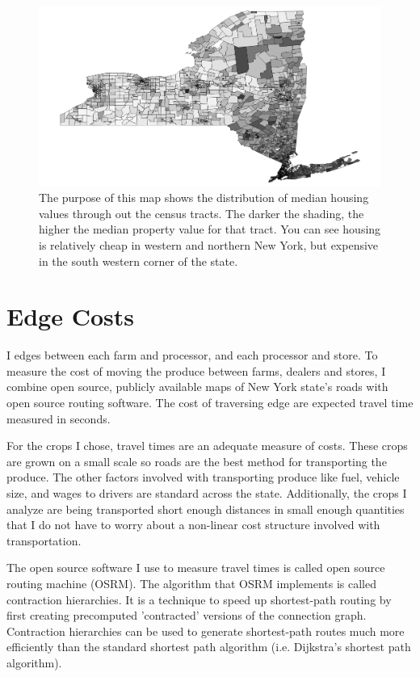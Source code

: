 \documentclass{report}
\begin{document}
\begin{figure}
\centering
\begin{framed}
\includegraphics[scale=.50]{map_4}
\caption{The purpose of this map shows the distribution of median housing values through out the census tracts. The darker the shading, the higher the median property value for that tract. You can see housing is relatively cheap in western and northern New York, but expensive in the south western corner of the state.}
\label{fig:map_4}
\end{framed}
\end{figure}

\section{Edge Costs}

I edges between each farm and processor, and each processor and store. To measure the cost of moving the produce between farms, dealers and stores, I combine open source, publicly available maps of New York state's roads with open source routing software. The cost of traversing edge are expected travel time measured in seconds. 

For the crops I chose, travel times are an adequate measure of costs. These crops are grown on a small scale so roads are the best method for transporting the produce. The other factors involved with transporting produce like fuel, vehicle size, and wages to drivers are standard across the state. Additionally, the crops I analyze are being transported short enough distances in small enough quantities that I do not have to worry about a non-linear cost structure involved with transportation.

The open source software I use to measure travel times is called open source routing machine (OSRM). The algorithm that OSRM implements is called contraction hierarchies. It is a technique to speed up shortest-path routing by first creating precomputed 'contracted' versions of the connection graph. Contraction hierarchies can be used to generate shortest-path routes much more efficiently than the standard shortest path algorithm (i.e. Dijkstra's shortest path algorithm).
\end{document}
